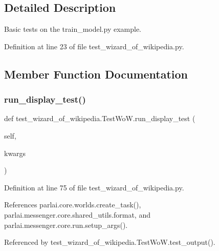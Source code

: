 \subsection{Detailed Description}
\begin{DoxyVerb}Basic tests on the train_model.py example.\end{DoxyVerb}
 

Definition at line 23 of file test\+\_\+wizard\+\_\+of\+\_\+wikipedia.\+py.



\subsection{Member Function Documentation}
\mbox{\label{classtest__wizard__of__wikipedia_1_1TestWoW_a8817f78f5eb9d33489bc79c305d174cc}} 
\subsubsection{\texorpdfstring{run\+\_\+display\+\_\+test()}{run\_display\_test()}}
{\footnotesize\ttfamily def test\+\_\+wizard\+\_\+of\+\_\+wikipedia.\+Test\+Wo\+W.\+run\+\_\+display\+\_\+test (\begin{DoxyParamCaption}\item[{}]{self,  }\item[{}]{kwargs }\end{DoxyParamCaption})}



Definition at line 75 of file test\+\_\+wizard\+\_\+of\+\_\+wikipedia.\+py.



References parlai.\+core.\+worlds.\+create\+\_\+task(), parlai.\+messenger.\+core.\+shared\+\_\+utils.\+format, and parlai.\+messenger.\+core.\+run.\+setup\+\_\+args().



Referenced by test\+\_\+wizard\+\_\+of\+\_\+wikipedia.\+Test\+Wo\+W.\+test\+\_\+output().

